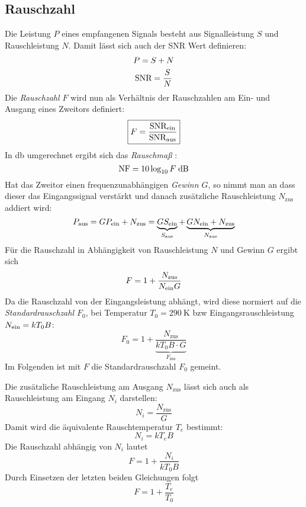 \subsection{Rauschzahl}
Die Leistung $P$ eines empfangenen Signals besteht aus Signalleistung $S$ und Rauschleistung $N$.
Damit lässt sich auch der SNR Wert definieren:
\begin{gather}
    P=S+N\\
    \text{SNR} = \frac{S}{N}
\end{gather}
Die \emph{Rauschzahl $F$} wird nun als Verhältnis der Rauschzahlen am Ein- und Ausgang eines Zweitors
definiert:
\begin{equation}
    \boxed{F = \frac{\text{SNR}_{\text{ein}}}{\text{SNR}_{\text{aus}}}}
\end{equation}
In \si{\decibel} umgerechnet ergibt sich das \emph{Rauschmaß} \NF:
\begin{equation}
    \NF = 10\log_{10} F \; \si{\decibel}
\end{equation}
Hat das Zweitor einen frequenzunabhängigen \emph{Gewinn $G$}, so nimmt man an dass dieser das
Eingangssignal verstärkt und danach zusätzliche Rauschleistung $N_\text{zus}$ addiert wird:
\begin{equation}
    P_{\text{aus}} = GP_{\text{ein}} + N_\text{zus} = \underbrace{GS_{\text{ein}}}_{S_{\text{aus}}} + \underbrace{GN_{\text{ein}} + N_\text{zus}}_{N_{\text{aus}}}
\end{equation}
Für die Rauschzahl in Abhängigkeit von Rauschleistung $N$ und Gewinn $G$ ergibt sich
\begin{equation}
    F = 1 + \frac{N_\text{zus}}{N_{\text{ein}} G}
\end{equation}
Da die Rauschzahl von der Eingangsleistung abhängt, wird diese normiert auf die
\emph{ Standardrauschzahl $F_0$}, bei Temperatur $T_0 = \SI{290}{\kelvin}$ bzw Eingangsrauschleistung
$N_{\text{ein}} = kT_0B$:
\begin{equation}
    F_0 = 1 + \underbrace{\frac{N_\text{zus}}{kT_0B \cdot G}}_{F_\text{zus}}
\end{equation}
Im Folgenden ist mit $F$ die Standardrauschzahl $F_0$ gemeint.

Die zusätzliche Rauschleistung am Ausgang $N_\text{zus}$ lässt sich auch als Rauschleistung am Eingang
$N_i$ darstellen:
\begin{equation}
    N_i = \frac{N_\text{zus}}{G}
\end{equation}
Damit wird die äquivalente Rauschtemperatur $T_e$ bestimmt:
\begin{equation}
    N_i = kT_eB
\end{equation}
Die Rauschzahl abhängig von $N_i$ lautet
\begin{equation}
    F = 1 + \frac{N_i}{kT_0B}
\end{equation}
Durch Einsetzen der letzten beiden Gleichungen folgt
\begin{equation}
    F = 1 + \frac{T_e}{T_0}
\end{equation}

